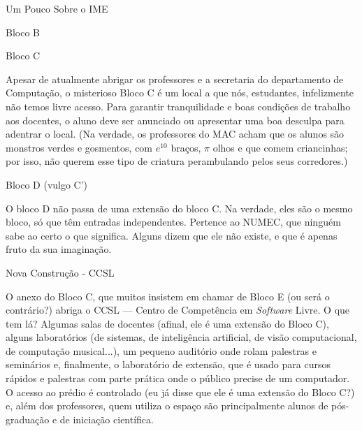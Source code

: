 \begin{secao}{Um Pouco Sobre o IME}
\begin{subsecao}{Bloco B}
\begin{itemize}
\end{itemize}
\end{subsecao}

\begin{subsecao}{Bloco C}

Apesar de atualmente abrigar os professores e a secretaria do departamento de
Computação, o misterioso Bloco C é um local a que nós, estudantes, infelizmente não
temos livre acesso. Para garantir tranquilidade e boas condições de trabalho aos
docentes, o aluno deve ser anunciado ou apresentar uma boa desculpa para adentrar
o local. (Na verdade, os professores do MAC acham que os alunos são monstros
verdes e gosmentos, com $e^{10}$ braços, $\pi$ olhos e que comem criancinhas;
por isso, não querem esse tipo de criatura perambulando pelos seus corredores.)

\end{subsecao}

\begin{subsecao}{Bloco D (vulgo C')}

O bloco D não passa de uma extensão do bloco C. Na verdade, eles são o mesmo bloco,
só que têm entradas independentes. Pertence ao NUMEC, que ninguém sabe ao certo
o que significa. Alguns dizem que ele não existe, e que é apenas fruto da sua
imaginação.

\end{subsecao}

\begin{subsecao}{Nova Construção - CCSL}

O anexo do Bloco C, que muitos insistem em chamar de Bloco E (ou será o
 contrário?) abriga o CCSL --- Centro de Competência em \textit{Software} Livre.
 O que tem lá? Algumas salas de docentes (afinal, ele é uma extensão do
 Bloco C), alguns laboratórios (de sistemas, de inteligência artificial,
 de visão computacional, de computação musical...), um pequeno auditório
 onde rolam palestras e seminários e, finalmente, o laboratório de extensão,
 que é usado para cursos rápidos e palestras com parte prática onde o público
 precise de um computador.\\
O acesso ao prédio é controlado (eu já disse que ele é uma extensão do Bloco C?)
 e, além dos professores, quem utiliza o espaço são principalmente alunos de
 pós-graduação e de iniciação científica.

\end{subsecao}
\end{secao}
